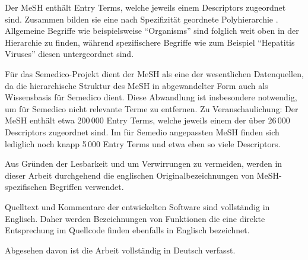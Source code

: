 Der MeSH enthält Entry Terms, welche jeweils einem Descriptors zugeordnet sind. Zusammen bilden sie eine nach Spezifizität geordnete Polyhierarchie \cite{MeSHWeb2012}. Allgemeine Begriffe wie beispielsweise "`Organisms"' sind folglich weit oben in der Hierarchie zu finden, während spezifischere Begriffe wie zum Beispiel "`Hepatitis Viruses"' diesen untergeordnet sind. \par

Für das Semedico-Projekt dient der MeSH als eine der wesentlichen Datenquellen, da die hierarchische Struktur des MeSH in abgewandelter Form auch als Wissensbasis für Semedico dient. Diese Abwandlung ist insbesondere notwendig, um für Semedico nicht relevante Terme zu entfernen. Zu Veranschaulichung: Der MeSH enthält etwa 200\,000 Entry Terms, welche jeweils einem der über 26\,000 Descriptors zugeordnet sind. Im für Semedio angepassten MeSH finden sich lediglich noch knapp 5\,000 Entry Terms und etwa eben so viele Descriptors.



Aus Gründen der Lesbarkeit und um Verwirrungen zu vermeiden, werden in dieser Arbeit durchgehend die englischen Originalbezeichnungen von MeSH-spezifischen Begriffen verwendet. \par

Quelltext und Kommentare der entwickelten Software sind vollständig in Englisch. Daher werden Bezeichnungen von Funktionen die eine direkte Entsprechung im Quellcode finden ebenfalls in Englisch bezeichnet. \par 

Abgesehen davon ist die Arbeit vollständig in Deutsch verfasst.